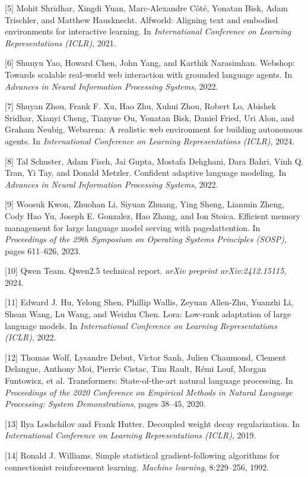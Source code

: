\documentclass{article}
\begin{document}
[5] Mohit Shridhar, Xingdi Yuan, Marc-Alexandre C\^ot\'e, Yonatan
Bisk, Adam Trischler, and Matthew Hausknecht. Alfworld: Aligning
text and embodied environments for interactive learning. In
\textit{International Conference on Learning Representations
(ICLR)}, 2021.

[6] Shunyu Yao, Howard Chen, John Yang, and Karthik Narasimhan.
Webshop: Towards scalable real-world web interaction with
grounded language agents. In \textit{Advances in Neural
Information Processing Systems}, 2022.

[7] Shuyan Zhou, Frank F. Xu, Hao Zhu, Xuhui Zhou, Robert Lo,
Abishek Sridhar, Xianyi Cheng, Tianyue Ou, Yonatan Bisk, Daniel
Fried, Uri Alon, and Graham Neubig. Webarena: A realistic web
environment for building autonomous agents. In \textit{International
Conference on Learning Representations (ICLR)}, 2024.

[8] Tal Schuster, Adam Fisch, Jai Gupta, Mostafa Dehghani, Dara
Bahri, Vinh Q. Tran, Yi Tay, and Donald Metzler. Confident
adaptive language modeling. In \textit{Advances in Neural
Information Processing Systems}, 2022.

[9] Woosuk Kwon, Zhuohan Li, Siyuan Zhuang, Ying Sheng, Lianmin
Zheng, Cody Hao Yu, Joseph E. Gonzalez, Hao Zhang, and Ion
Stoica. Efficient memory management for large language model
serving with pagedattention. In \textit{Proceedings of the 29th
Symposium on Operating Systems Principles (SOSP)}, pages 611--626,
2023.

[10] Qwen Team. Qwen2.5 technical report.
\textit{arXiv preprint arXiv:2412.15115}, 2024.

[11] Edward J. Hu, Yelong Shen, Phillip Wallis, Zeyuan Allen-Zhu,
Yuanzhi Li, Shean Wang, Lu Wang, and Weizhu Chen. Lora: Low-rank
adaptation of large language models. In \textit{International
Conference on Learning Representations (ICLR)}, 2022.

[12] Thomas Wolf, Lysandre Debut, Victor Sanh, Julien Chaumond,
Clement Delangue, Anthony Moi, Pierric Cistac, Tim Rault, R\'emi
Louf, Morgan Funtowicz, et al. Transformers: State-of-the-art
natural language processing. In \textit{Proceedings of the 2020
Conference on Empirical Methods in Natural Language Processing:
System Demonstrations}, pages 38--45, 2020.

[13] Ilya Loshchilov and Frank Hutter. Decoupled weight decay
regularization. In \textit{International Conference on Learning
Representations (ICLR)}, 2019.

[14] Ronald J. Williams. Simple statistical gradient-following
algorithms for connectionist reinforcement learning.
\textit{Machine learning}, 8:229--256, 1992.
\end{document}
